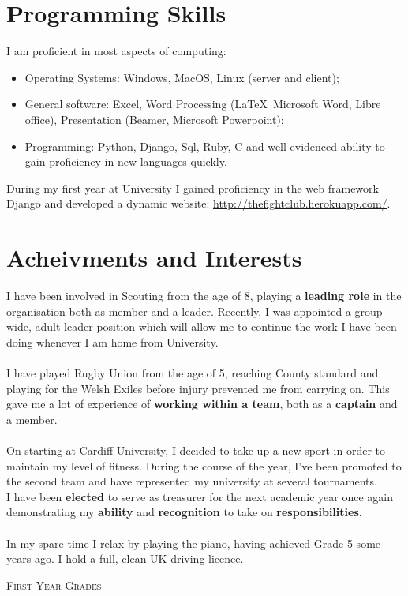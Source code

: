 \documentclass[a4paper]{article}
\begin{document}
\section{Programming Skills}
I am proficient in most aspects of computing:

\begin{itemize}
    \item Operating Systems: Windows, MacOS, Linux (server and client);
    \item General software: Excel, Word Processing (\LaTeX\, Microsoft Word, Libre office), Presentation (Beamer, Microsoft Powerpoint);
    \item Programming: Python, Django, Sql, Ruby, C and well evidenced ability to gain proficiency in new languages quickly.
\end{itemize}

During my first year at University I gained proficiency in the web framework Django and developed a dynamic website: \url{http://thefightclub.herokuapp.com/}.
\section{Acheivments and Interests}
I have been involved in Scouting from the age of 8, playing a \textbf{leading role} in the organisation both as member and a leader.
Recently, I was appointed a group-wide, adult leader position which will allow me to continue the work I have been doing whenever I am home from University. \\
\\
I have played Rugby Union from the age of 5, reaching County standard and playing for the Welsh Exiles before injury prevented me from carrying on.
This gave me a lot of experience of \textbf{working within a team}, both as a \textbf{captain} and a member. \\
\\
On starting at Cardiff University, I decided to take up a new sport in order to maintain my level of fitness.
During the course of the year, I've been promoted to the second team and have represented my university at several tournaments. \\
I have been \textbf{elected} to serve as treasurer for the next academic year once again demonstrating my \textbf{ability} and \textbf{recognition} to take on \textbf{responsibilities}.\\
\\
In my spare time I relax by playing the piano, having achieved Grade 5 some years ago. I hold a full, clean UK driving licence.
\bigskip
\par{\centering\Large {\textsc{First Year Grades}}
\par}
\end{document}

